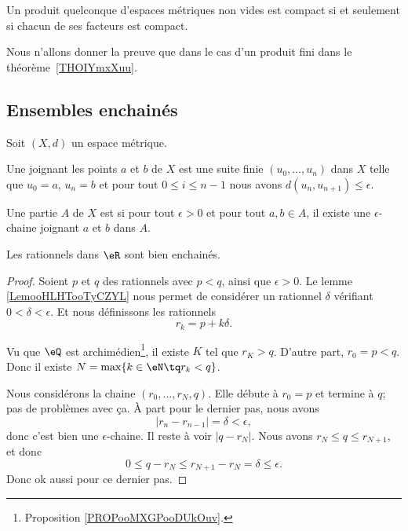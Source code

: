 \begin{theorem}[Tykhonov]\label{ThoFWXsQOZ}
	Un produit quelconque d'espaces métriques non vides est compact si et seulement si chacun de ses facteurs est compact.
\end{theorem}
Nous n'allons donner la preuve que dans le cas d'un produit fini dans le théorème~\ref{THOIYmxXuu}.

\subsection{Ensembles enchainés}

Soit \( (X,d)\) un espace métrique.
\begin{definition}
	Une  joignant les points \( a\) et \( b\) de \( X\) est une suite finie \( (u_0,\ldots, u_n)\) dans \( X\) telle que \( u_0=a\), \( u_n=b\) et pour tout \( 0\leq i\leq n-1\) nous avons \( d(u_n,u_{n+1})\leq \epsilon\).

	Une partie \( A\) de \( X\) est  si pour tout \( \epsilon>0\) et pour tout \( a,b\in A\), il existe une \( \epsilon\)-chaine joignant \( a\) et \( b\) dans \( A\).
\end{definition}


\begin{lemma}
	Les rationnels dans \( \eR\) sont bien enchainés.
\end{lemma}

\begin{proof}
	Soient \( p\) et \( q\) des rationnels avec \( p<q\), ainsi que \( \epsilon>0\). Le lemme \ref{LemooHLHTooTyCZYL} nous permet de considérer un rationnel \( \delta\) vérifiant \( 0<\delta<\epsilon\). Et nous définissons les rationnels
	\begin{equation}
		r_k=p+k\delta.
	\end{equation}

	Vu que \( \eQ\) est archimédien\footnote{Proposition \ref{PROPooMXGPooDUkOuv}.}, il existe \( K\) tel que \( r_{K}>q\). D'autre part, \( r_0=p<q\). Donc il existe \( N=\max\{ k\in \eN\tq r_k<q \}\).

	Nous considérons la chaine \( (r_0,\ldots, r_N, q)\). Elle débute à \( r_0=p\) et termine à \( q\); pas de problèmes avec ça. À part pour le dernier pas, nous avons
	\begin{equation}
		| r_n-r_{n-1} |=\delta<\epsilon,
	\end{equation}
	donc c'est bien une \( \epsilon\)-chaine. Il reste à voir \( | q-r_N |\). Nous avons \( r_N\leq q\leq r_{N+1}\), et donc
	\begin{equation}
		0\leq q-r_N\leq r_{N+1}-r_N=\delta\leq \epsilon.
	\end{equation}
	Donc ok aussi pour ce dernier pas.
\end{proof}

